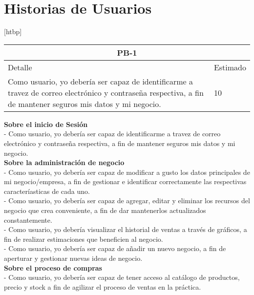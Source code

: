 
\chapter{Historias de Usuarios}[htbp]
\begin{table}
\begin{center}
\begin{tabular}{|p{12cm} | p{2cm} |}
	\hline
	\multicolumn{2}{|c|}{PB-1}\\
	\hline
	Detalle & Estimado \\
	\hline
	Como usuario, yo debería ser capaz de identificarme a travez de correo electrónico y contraseña respectiva, a fin de mantener seguros mis datos y mi negocio.  & 10 \\
	\hline	
\end{tabular}
\end{center}
\end{table}
\textbf{Sobre el inicio de Sesión}\\
- Como usuario, yo debería ser capaz de identificarme a travez de correo electrónico y contraseña respectiva, a fin de mantener seguros mis datos y mi negocio.\\
\textbf{Sobre la administración de negocio}\\
- Como usuario, yo debería ser capaz de modificar a gusto los datos principales de mi negocio/empresa, a fin de gestionar e identificar correctamente las respectivas caracteríasticas de cada uno.\\
- Como usuario, yo debería ser capaz de agregar, editar y eliminar los recursos del negocio que crea conveniente, a fin de dar mantenerlos actualizados constantemente.\\
- Como usuario, yo debería visualizar el historial de ventas a través de gráficos, a fin de realizar estimaciones que beneficien al negocio.\\
- Como usuario, yo debería ser capaz de añadir un nuevo negocio, a fin de aperturar y gestionar nuevas ideas de negocio.\\
\textbf{Sobre el proceso de compras}\\
- Como usuario, yo debería ser capaz de tener acceso al catálogo de productos, precio y stock a fin de agilizar el proceso de ventas en la práctica. 